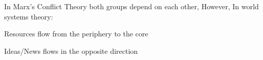 In Marx's Conflict Theory both groups depend on each other, However, In world systems theory:
\begin{bullets}
	\item Resources flow from the periphery to the core
	\item Ideas/News flows in the opposite direction
\end{bullets}